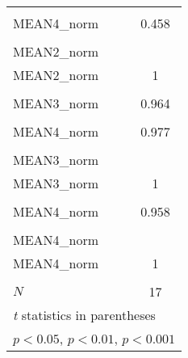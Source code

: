 {\begin{tabular}{l*{1}{c}}
            &                     \\
[1em]
MEAN4\_norm  &       0.458         \\
            &                     \\
\hline
MEAN2\_norm  &                     \\
MEAN2\_norm  &           1         \\
            &                     \\
[1em]
MEAN3\_norm  &       0.964\sym{***}\\
            &                     \\
[1em]
MEAN4\_norm  &       0.977\sym{***}\\
            &                     \\
\hline
MEAN3\_norm  &                     \\
MEAN3\_norm  &           1         \\
            &                     \\
[1em]
MEAN4\_norm  &       0.958\sym{***}\\
            &                     \\
\hline
MEAN4\_norm  &                     \\
MEAN4\_norm  &           1         \\
            &                     \\
\hline
\(N\)       &          17         \\
\hline\hline
\multicolumn{2}{l}{\footnotesize \textit{t} statistics in parentheses}\\
\multicolumn{2}{l}{\footnotesize \sym{*} \(p<0.05\), \sym{**} \(p<0.01\), \sym{***} \(p<0.001\)}\\
\end{tabular}
}
